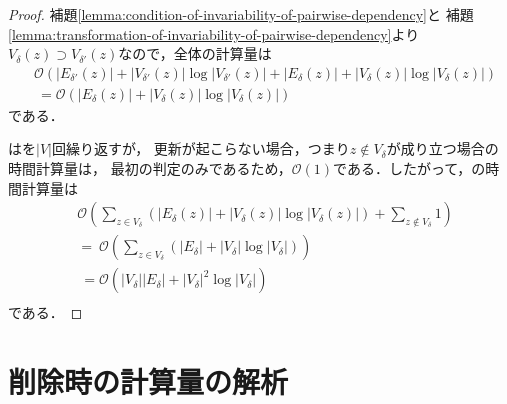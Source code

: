 \begin{proof}
  補題\ref{lemma:condition-of-invariability-of-pairwise-dependency}と
  補題\ref{lemma:transformation-of-invariability-of-pairwise-dependency}より
  $V_\delta(z)\supset V_{\delta'}(z)$なので，全体の計算量は
  \begin{equation*}
    \begin{aligned}
      &\mathcal{O}(
        \lvert E_{\delta'}(z)\rvert+\lvert V_{\delta'}(z)\rvert\log\lvert V_{\delta'}(z)\rvert
        +\lvert E_\delta(z)\rvert+\lvert V_\delta(z)\rvert\log\lvert V_\delta(z)\rvert
      ) \nonumber\\
      &\:=\mathcal{O}(\lvert E_\delta(z)\rvert+\lvert V_\delta(z)\rvert\log\lvert V_\delta(z)\rvert)
    \end{aligned}
  \end{equation*}
  である．

  はを$\lvert V\rvert$回繰り返すが，
  更新が起こらない場合，つまり$z\notin V_\delta$が成り立つ場合の時間計算量は，
  最初の判定のみであるため，$\mathcal{O}(1)$である．したがって，の時間計算量は
  \begin{equation*}
    \begin{aligned}
      &\mathcal{O}(
      \sum_{z\in V_\delta}(\lvert E_\delta(z)\rvert+\lvert V_\delta(z)\rvert\log\lvert V_\delta(z)\rvert)
      +\sum_{z\notin V_\delta}1) \nonumber\\
      &=\:\mathcal{O}(\sum_{z\in V_\delta}(\lvert E_\delta\rvert
      +\lvert V_\delta\rvert\log\lvert V_\delta\rvert))\nonumber\\
      &\:=\mathcal{O}(\lvert V_\delta\rvert\lvert E_\delta\rvert
      +\lvert V_\delta\rvert^2\log\lvert V_\delta\rvert) \nonumber\\
    \end{aligned}
  \end{equation*}
  である．
\end{proof}

\section{削除時の計算量の解析}
\label{subsect:computational-complexity-of-decremental-algorithm}

